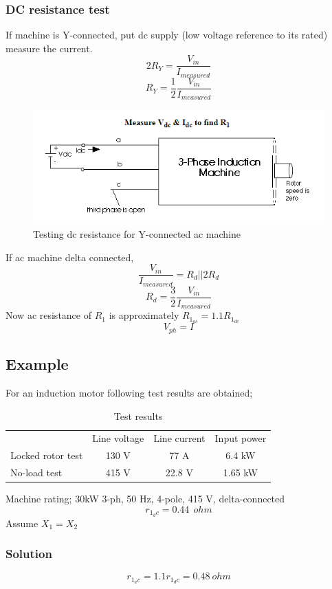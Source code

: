 \documentclass[11 pt]{article}
\begin{document}
\subsubsection*{DC resistance test}
If machine is Y-connected, put dc supply (low voltage reference to its rated) measure the current.
\[2R_Y=\frac{V_{in}}{I_{measured}}\]
\[R_Y=\frac{1}{2}\frac{V_{in}}{I_{measured}}\]
\begin{figure}[H]
\centering
  \includegraphics[scale=0.7]{dcy}
  \caption{Testing dc resistance for Y-connected ac machine}
  \label{fig:zero}
\end{figure}
If ac machine delta connected,
\[\frac{V_{in}}{I_{measured}}=R_d || 2R_d\]
\[R_d=\frac{3}{2}\frac{V_{in}}{I_{measured}}\]
Now ac resistance of $R_1$ is approximately $R_{1_{ac}}=1.1 R_{1_{dc}}$
\[V_{ph}=I\]
\subsection*{Example}
For an induction motor following test results are obtained;
\begin{table}[H]
\centering
\caption{Test results}
\label{my-label}
\begin{tabular}{lccc}
                  & Line voltage & Line current & Input power \\
Locked rotor test & 130 V        & 77 A         & 6.4 kW      \\
No-load test      & 415 V        & 22.8 V       & 1.65 kW    
\end{tabular}
\end{table}
Machine rating; 30kW 3-ph, 50 Hz, 4-pole, 415 V, delta-connected
\[r_{1_dc}=0.44\>\>ohm\]
Assume $X_1=X_2$
\subsubsection*{Solution}
\[r_{1_ac}=1.1r_{1_dc}=0.48 \> ohm\]
\end{document}
